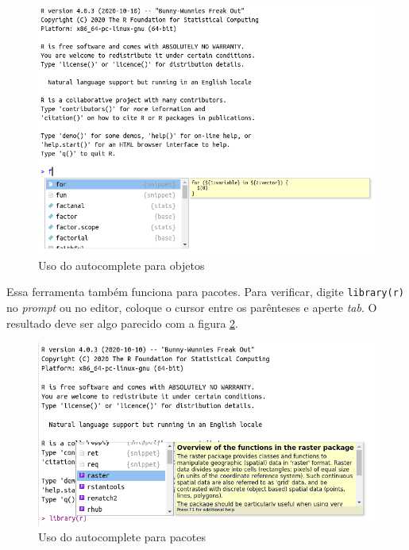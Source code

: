 \documentclass[
  11pt,
]{book}
\begin{document}
\begin{figure}[!htbp]

{\centering \includegraphics[width=1\linewidth]{00-text-resources/figs/autocomplete_objetos} 

}

\caption{Uso do autocomplete para objetos}\label{fig:autocomplete}
\end{figure}

Essa ferramenta também funciona para pacotes. Para verificar, digite \texttt{library(r)} no \emph{prompt} ou no editor, coloque o cursor entre os parênteses e aperte \emph{tab}. O resultado deve ser algo parecido com a figura \ref{fig:autocomplete-pacotes}.

\begin{figure}[!htbp]

{\centering \includegraphics[width=1\linewidth]{00-text-resources/figs/autocomplete_pacotes} 

}

\caption{Uso do autocomplete para pacotes}\label{fig:autocomplete-pacotes}
\end{figure}
\end{document}
